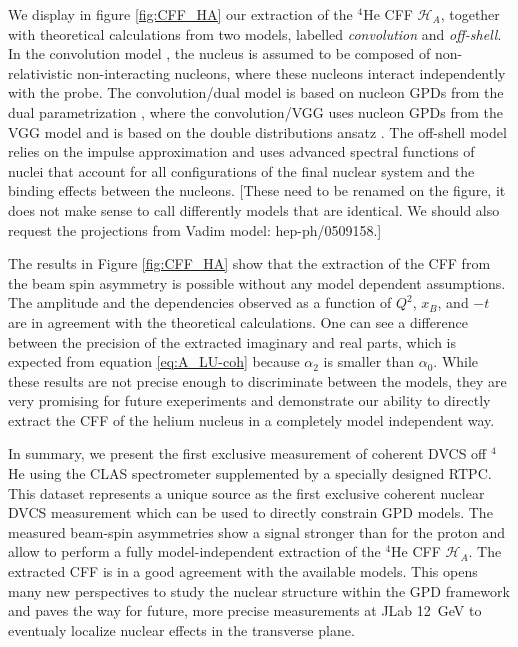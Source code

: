 \documentclass[preprint,nofootinbib,showpacs,prl,superscriptaddress,secnumarabic,amssymb,nobibnotes,aps,floatfix]{revtex4}
\begin{document}
We display in figure \ref{fig:CFF_HA} our extraction of the $^4$He CFF 
$\mathcal{H}_A$, together with theoretical calculations from two models, 
labelled {\em convolution} and {\em off-shell}. In the convolution 
model \cite{Vadim_priv}, the nucleus is assumed to be composed of 
non-relativistic non-interacting nucleons, where these nucleons interact 
independently with the probe. The convolution/dual model is based on nucleon GPDs from 
the dual parametrization \cite{Guzey:2006xi}, where the convolution/VGG uses nucleon GPDs  
from the VGG model and is based on the double distributions ansatz 
\cite{DD_model}. The off-shell model \cite{GonzalezHernandez:2012jv} relies on the 
impulse approximation and uses advanced spectral functions of  
nuclei that account for all configurations of the final nuclear system and the 
binding effects between the nucleons.
[These need to be renamed on the figure, it does not make sense to call differently
models that are identical. We should also request the projections from Vadim
model: hep-ph/0509158.]

The results in Figure \ref{fig:CFF_HA} show that the extraction of the CFF
from the beam spin asymmetry is possible without any model dependent 
assumptions. The amplitude and the dependencies observed as a function of 
$Q^{2}$, $x_B$, and $-t$ are in agreement 
with the theoretical calculations. One can see a difference between the 
precision of the extracted imaginary and real parts, which is expected from
equation \ref{eq:A_LU-coh} because $\alpha_2$ is smaller than $\alpha_0$. 
While these results are not precise enough to discriminate between the models,
they are very promising for future exeperiments and demonstrate our ability
to directly extract the CFF of the helium nucleus in a completely model
independent way.


In summary, we present the first exclusive measurement of coherent DVCS 
off $^4$He using the CLAS spectrometer supplemented  
by a specially designed RTPC. This dataset represents a 
unique source as the first exclusive coherent nuclear DVCS measurement which 
can be used to directly constrain GPD models. The measured beam-spin asymmetries 
show a signal stronger than for the proton and allow to perform a fully 
model-independent extraction of the $^4$He CFF $\mathcal{H}_A$. The extracted 
CFF is in a good agreement with the available models. This opens 
many new perspectives to study the nuclear structure within the GPD framework 
and paves the way for future, more precise measurements at JLab 12~GeV to 
eventualy localize nuclear effects in the transverse plane.
\end{document}
